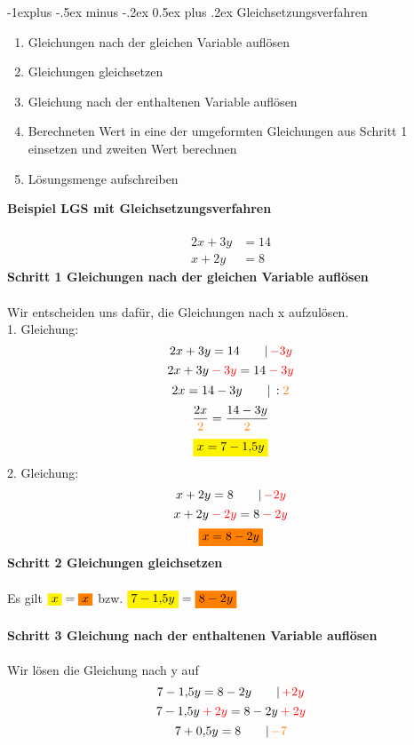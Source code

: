 \documentclass[10pt,landscape]{article}
\makeatletter
\renewcommand{\subsection}{\@startsection{subsection}{2}{0mm}%
                                {-1explus -.5ex minus -.2ex}%
                                {0.5ex plus .2ex}%
                                {\normalfont\normalsize\bfseries}}
\makeatother
\begin{document}
\begin{multicols}{3}
    \subsection{Gleichsetzungsverfahren}
    \begin{enumerate}
        \item Gleichungen nach der gleichen Variable auflösen
        \item Gleichungen gleichsetzen
        \item Gleichung nach der enthaltenen Variable auflösen
        \item Berechneten Wert in eine der umgeformten Gleichungen aus Schritt 1 einsetzen und zweiten Wert berechnen
        \item Lösungsmenge aufschreiben
    \end{enumerate}
    \textbf{Beispiel LGS mit Gleichsetzungsverfahren}\\~\\
    \begin{align*} 2x + 3y &= 14 \\ x + 2y &= 8 \end{align*}
    \textbf{Schritt 1 Gleichungen nach der gleichen Variable auflösen}\\~\\
    Wir entscheiden uns dafür, die Gleichungen nach x aufzulösen. \\
    1. Gleichung:
    \[2x + 3y = 14 \qquad |\, {\color{red}-3y}\]
    \[2x + 3y {\color{red}\: - \: 3y} = 14 {\color{red}\: - \: 3y}\]
    \[2x = 14 - 3y \qquad |\, :{\color{orange}2}\]
    \[\frac{2x}{{\color{orange}2}} = \frac{14 - 3y}{{\color{orange}2}}\]
    \[{\colorbox{yellow}{$x = 7 - 1{,}5y$}}\]
    2. Gleichung:
    \[x + 2y = 8 \qquad |\, {\color{red}-2y}\]
    \[x + 2y {\color{red}\: - \: 2y} = 8 {\color{red}\: - \: 2y}\]
    \[{\colorbox{orange}{$x = 8 - 2y$}}\]
    \textbf{Schritt 2 Gleichungen gleichsetzen}\\~\\
    Es gilt ${\colorbox{yellow}{$x$}} = {\colorbox{orange}{$x$}}$ bzw. ${\colorbox{yellow}{$7 - 1{,}5y$}} = {\colorbox{orange}{$8 - 2y$}}$\\~\\
    \textbf{Schritt 3 Gleichung nach der enthaltenen Variable auflösen}\\~\\
    Wir lösen die Gleichung nach y auf
    \[7 - 1{,}5y = 8 - 2y \qquad |\, {\color{red}+2y}\]
    \[7 - 1{,}5y {\color{red} \: + \: 2y} = 8 - 2y {\color{red}\: + \: 2y}\]
    \[7 + 0{,}5y = 8 \qquad |\, {\color{orange}-7}\]

\end{multicols}
\end{document}
